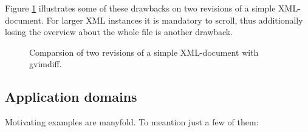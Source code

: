 \documentclass{llncs}
\begin{document}
Figure \ref{fig:gvimdiff} illustrates some of these drawbacks on two revisions of a simple XML-document. For larger XML instances it is mandatory to scroll, thus additionally losing the overview about the whole file is another drawback.

\begin{figure}[htb]
\caption{\label{fig:gvimdiff} Comparsion of two revisions of a simple XML-document with gvimdiff.}
\end{figure}

\subsection{Application domains}

Motivating examples are manyfold. To meantion just a few of them:
\end{document}
